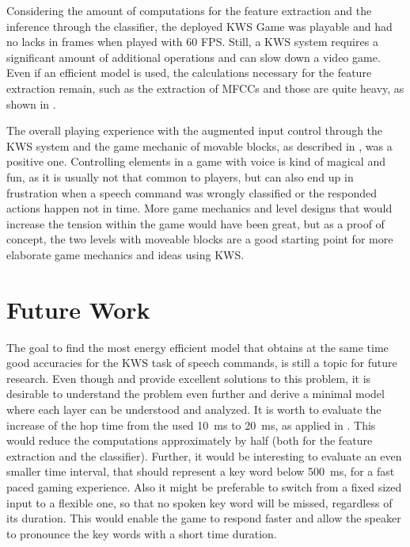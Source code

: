 Considering the amount of computations for the feature extraction and the inference through the classifier, the deployed KWS Game was playable and had no lacks in frames when played with 60 FPS.
Still, a KWS system requires a significant amount of additional operations and can slow down a video game.
Even if an efficient model is used, the calculations necessary for the feature extraction remain, such as the extraction of MFCCs and those are quite heavy, as shown in .

The overall playing experience with the augmented input control through the KWS system and the game mechanic of movable blocks, as described in , was a positive one.
Controlling elements in a game with voice is kind of magical and fun, as it is usually not that common to players, but can also end up in frustration when a speech command was wrongly classified or the responded actions happen not in time.
More game mechanics and level designs that would increase the tension within the game would have been great, but as a proof of concept, the two levels with moveable blocks are a good starting point for more elaborate game mechanics and ideas using KWS.



\section{Future Work}
The goal to find the most energy efficient model that obtains at the same time good accuracies for the KWS task of speech commands, is still a topic for future research.
Even though \cite{Zhang2017} and \cite{Peter2020} provide excellent solutions to this problem, it is desirable to understand the problem even further and derive a minimal model where each layer can be understood and analyzed.
It is worth to evaluate the increase of the hop time from the used \SI{10}{\milli\second} to \SI{20}{\milli\second}, as applied in \cite{Peter2020}.
This would reduce the computations approximately by half (both for the feature extraction and the classifier).
Further, it would be interesting to evaluate an even smaller time interval, that should represent a key word below \SI{500}{\milli\second}, for a fast paced gaming experience.
Also it might be preferable to switch from a fixed sized input to a flexible one, so that no spoken key word will be missed, regardless of its duration.
This would enable the game to respond faster and allow the speaker to pronounce the key words with a short time duration.

